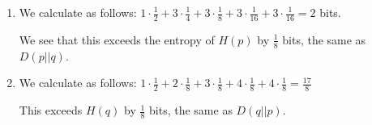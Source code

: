 \documentclass[12pt]{article}
\begin{document}
\begin{enumerate}[label=(\alph*)]
\begin{enumerate}[label=(\roman*)]
            \item
                We calculate as follows: $1 \cdot \frac{1}{2} + 3 \cdot \frac{1}{4} + 3 \cdot \frac{1}{8} + 3 \cdot \frac{1}{16} + 3 \cdot \frac{1}{16} = 2$ bits.

                We see that this exceeds the entropy of $H(p)$ by $\frac{1}{8}$ bits, the same as $D(p||q)$.

            \item
                We calculate as follows: $1 \cdot \frac{1}{2} + 2 \cdot \frac{1}{8} + 3 \cdot \frac{1}{8} + 4 \cdot \frac{1}{8} + 4 \cdot \frac{1}{8} = \frac{17}{8}$

                This exceeds $H(q)$ by $\frac{1}{8}$ bits, the same as $D(q||p)$.
        \end{enumerate}

        
    \end{enumerate}
\end{document}
